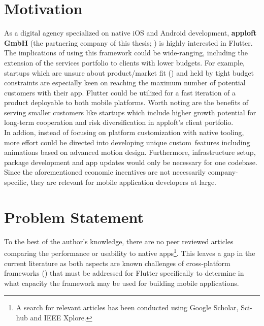 \section{Motivation}
\label{section:motivation}
As a digital agency specialized on native iOS and Android development, \textbf{apploft GmbH} 
(the partnering company of this thesis; \cite{apploft2021}) is highly interested in Flutter. 
The implications of using this framework could be wide-ranging, including the extension of the services portfolio
to clients with lower budgets.
For example, startups which are unsure about product/market fit (\cite{Andreesen2007}) and held by tight budget constraints are especially keen on reaching 
the maximum number of potential customers with their app. Flutter could be utilized for a fast iteration of a product deployable to 
both mobile platforms. 
Worth noting are the benefits of serving smaller customers like startups which include higher growth potential for long-term cooperation
and risk diversification in apploft's client portfolio.\\
In addion, instead of focusing on platform customization with native tooling, more effort could 
be directed into developing unique custom features including animations based on advanced motion design.
Furthermore, infrastructure setup, package development and app updates would only be necessary for one codebase.\\
Since the aforementioned economic incentives are not necessarily company-specific, they are relevant for mobile application developers at large.

\section{Problem Statement}
To the best of the author's knowledge, there are no peer reviewed articles comparing the performance or usability to native apps\footnote{A search for relevant articles has been conducted using Google Scholar, Sci-hub and IEEE Xplore.}.
This leaves a gap in the current literature as both aspects are known challenges of cross-platform frameworks (\cite{BioernHansen2019}) that must be addressed for Flutter specifically to determine in what capacity the framework may be used for building mobile applications.

